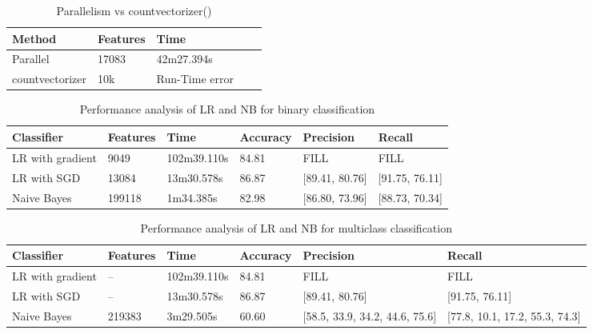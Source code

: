 \documentclass{article}
\begin{document}
\begin{table}[H]
\caption{Parallelism vs countvectorizer()}
\label{sample-table}
\begin{center}
\begin{small}
\begin{sc}
\begin{tabular}{lllll}
\hline
Method & Features & Time \\
\hline
Parallel  & 17083 & 42m27.394s \\
countvectorizer  & 10k & Run-Time error \\
\hline
\end{tabular}
\end{sc}
\end{small}
\end{center}
\end{table}



\begin{table*}[b]
\caption{Performance analysis of LR and NB for binary classification}
\label{sample-table}
\begin{center}
\begin{small}
\begin{sc}
\begin{tabular}{llllll}
\hline
Classifier & Features & Time & Accuracy & Precision & Recall\\
\hline
LR with gradient & 9049 & 102m39.110s & 84.81 & FILL & FILL \\
LR with SGD & 13084 & 13m30.578s & 86.87 & [89.41, 80.76] & [91.75, 76.11] \\
Naive Bayes & 199118 & 1m34.385s & 82.98 & [86.80, 73.96] & [88.73, 70.34] \\
\hline
\end{tabular}
\end{sc}
\end{small}
\end{center}
\end{table*}


\begin{table*}[b]
\caption{Performance analysis of LR and NB for multiclass classification}
\label{sample-table}
\begin{center}
\begin{small}
\begin{sc}
\begin{tabular}{llllll}
\hline
Classifier & Features & Time & Accuracy & Precision & Recall\\
\hline
LR with gradient & -- & 102m39.110s & 84.81 & FILL & FILL \\
LR with SGD & -- & 13m30.578s & 86.87 & [89.41, 80.76] & [91.75, 76.11] \\
Naive Bayes & 219383 & 3m29.505s & 60.60 & [58.5, 33.9, 34.2, 44.6, 75.6] & [77.8, 10.1, 17.2, 55.3, 74.3] \\
\hline
\end{tabular}
\end{sc}
\end{small}
\end{center}
\end{table*}
\end{document}
